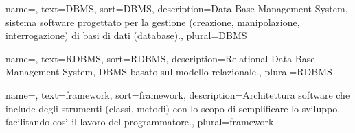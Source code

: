{
	name=,
	text=DBMS,
	sort=DBMS,
	description={Data Base Management System, sistema software progettato per la gestione (creazione, manipolazione, interrogazione) di basi di dati (database).},
	plural=DBMS
}

{
	name=,
	text=RDBMS,
	sort=RDBMS,
	description={Relational Data Base Management System, DBMS basato sul modello relazionale.},
	plural=RDBMS
}


{
	name=,
	text=framework,
	sort=framework,
	description={Architettura software che include degli strumenti (classi, metodi) con lo scopo di semplificare lo sviluppo, facilitando così il lavoro del programmatore.},
	plural=framework
}